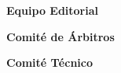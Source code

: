 \newpage
\pagestyle{plain}

\begin{center}
\textbf{Equipo Editorial}\\


\vskip1cm

\textbf{Comité de Árbitros}\\


\vskip1cm

\textbf{Comité Técnico}\\



\end{center}
\pagebreak 

